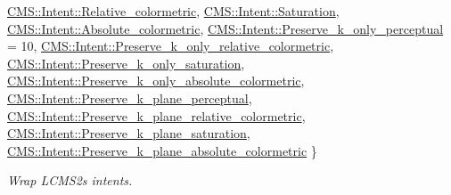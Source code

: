 \begin{DoxyCompactItemize}
\hyperlink{namespace_c_m_s_aabe6afbe3c2cd6188befc3096f1ea069ae15cd0041e7b8a99a1fd66c52b44bfd8}{C\+M\+S\+::\+Intent\+::\+Relative\+\_\+colormetric}, 
\hyperlink{namespace_c_m_s_aabe6afbe3c2cd6188befc3096f1ea069a2e3307b9b1a2cc64b48f1cd6977a4b29}{C\+M\+S\+::\+Intent\+::\+Saturation}, 
\hyperlink{namespace_c_m_s_aabe6afbe3c2cd6188befc3096f1ea069a699eeb6f610370295e083eba32154356}{C\+M\+S\+::\+Intent\+::\+Absolute\+\_\+colormetric}, 
\newline
\hyperlink{namespace_c_m_s_aabe6afbe3c2cd6188befc3096f1ea069a174bb81ca3e5b185508b9cf38a1686ae}{C\+M\+S\+::\+Intent\+::\+Preserve\+\_\+k\+\_\+only\+\_\+perceptual} = 10, 
\hyperlink{namespace_c_m_s_aabe6afbe3c2cd6188befc3096f1ea069ac36c09559ae225fec0daa2270ee1937d}{C\+M\+S\+::\+Intent\+::\+Preserve\+\_\+k\+\_\+only\+\_\+relative\+\_\+colormetric}, 
\hyperlink{namespace_c_m_s_aabe6afbe3c2cd6188befc3096f1ea069ada1d24f9665ef402a8df2800027fa6e8}{C\+M\+S\+::\+Intent\+::\+Preserve\+\_\+k\+\_\+only\+\_\+saturation}, 
\hyperlink{namespace_c_m_s_aabe6afbe3c2cd6188befc3096f1ea069a2201ddcfa0cf1ef27141ae9d7cc10aa8}{C\+M\+S\+::\+Intent\+::\+Preserve\+\_\+k\+\_\+only\+\_\+absolute\+\_\+colormetric}, 
\newline
\hyperlink{namespace_c_m_s_aabe6afbe3c2cd6188befc3096f1ea069aa6341811efb776bb56f7be74fd2c6a02}{C\+M\+S\+::\+Intent\+::\+Preserve\+\_\+k\+\_\+plane\+\_\+perceptual}, 
\hyperlink{namespace_c_m_s_aabe6afbe3c2cd6188befc3096f1ea069ae4062d9845bdc5d137dc15c6792c3149}{C\+M\+S\+::\+Intent\+::\+Preserve\+\_\+k\+\_\+plane\+\_\+relative\+\_\+colormetric}, 
\hyperlink{namespace_c_m_s_aabe6afbe3c2cd6188befc3096f1ea069ada8f28ee52fca7e4c8a8f217a864ad09}{C\+M\+S\+::\+Intent\+::\+Preserve\+\_\+k\+\_\+plane\+\_\+saturation}, 
\hyperlink{namespace_c_m_s_aabe6afbe3c2cd6188befc3096f1ea069ad691fc3212388b53f8e3d96349c66c82}{C\+M\+S\+::\+Intent\+::\+Preserve\+\_\+k\+\_\+plane\+\_\+absolute\+\_\+colormetric}
 \}\begin{DoxyCompactList}\small\item\em Wrap L\+C\+M\+S2\textquotesingle{}s intents. \end{DoxyCompactList}
\end{DoxyCompactItemize}
